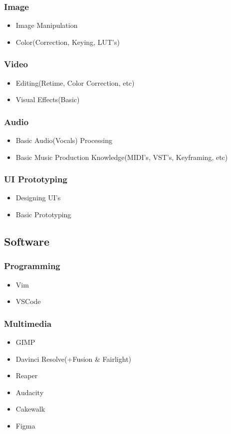 \documentclass{article}
\begin{document}
			\subsubsection{Image}
				\begin{itemize}
					\item Image Manipulation
					\item Color(Correction, Keying, LUT's)
				\end{itemize}
			\subsubsection{Video}
				\begin{itemize}
					\item Editing(Retime, Color Correction, etc)
					\item Visual Effects(Basic)
				\end{itemize}
			\subsubsection{Audio}
				\begin{itemize}
					\item Basic Audio(Vocals) Processing
					\item Basic Music Production Knowledge(MIDI's, VST's, Keyframing, etc)
				\end{itemize}
			\subsubsection{UI Prototyping}
				\begin{itemize}
					\item Designing UI's
					\item Basic Prototyping
				\end{itemize}
		\subsection{Software}
			\subsubsection{Programming}
				\begin{itemize}
					\item Vim
					\item VSCode
				\end{itemize}
			\subsubsection{Multimedia}
				\begin{itemize}
					\item GIMP
					\item Davinci Resolve(+Fusion \& Fairlight)
					\item Reaper
					\item Audacity
					\item Cakewalk
					\item Figma
				\end{itemize}
\end{document}
